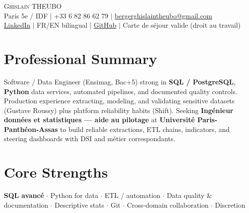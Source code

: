 \documentclass[letterpaper,10.5pt]{article}
\begin{document}
\begin{center}
{\Huge \scshape Ghislain THEUBO} \\ \vspace{2pt}
\small Paris 5e / IDF $|$ +33 6 82 86 62 79 $|$ \href{mailto:bergerghislaintheubo@gmail.com}{bergerghislaintheubo@gmail.com} \\
\href{https://www.linkedin.com/in/berger-ghislain}{LinkedIn} $|$ FR/EN bilingual $|$ \href{https://github.com/Bergerghislain}{GitHub} $|$ Carte de s\'ejour valide (droit au travail)
\end{center}
\vspace{-6pt}
\section{Professional Summary}
\small{Software / Data Engineer (Ensimag, Bac+5) strong in \textbf{SQL / PostgreSQL}, \textbf{Python} data services, automated pipelines, and documented quality controls. Production experience extracting, modeling, and validating sensitive datasets (Gustave Roussy) plus platform reliability habits (Shift). Seeking \textbf{Ing\'enieur donn\'ees et statistiques --- aide au pilotage} at \textbf{Universit\'e Paris-Panth\'eon-Assas} to build reliable extractions, ETL chains, indicators, and steering dashboards with DSI and m\'etier correspondants.}
\section{Core Strengths}
\small{\textbf{SQL avanc\'e} $\cdot$ Python for data $\cdot$ ETL / automation $\cdot$ Data quality \& documentation $\cdot$ Descriptive stats $\cdot$ Git $\cdot$ Cross-domain collaboration $\cdot$ Discretion}
\end{document}

